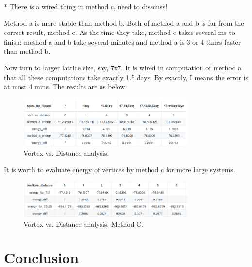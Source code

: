 \documentclass{article}
\begin{document}
* There is a wired thing in method c, need to disscuss!

Method a is more stable than method b. Both of method a and b is far from the correct result, method c. As the time they take, method c takes several ms to finish; method a and b take several minutes and method a is 3 or 4 times faster than method b.

Now turn to larger lattice size, say, 7x7. It is wired in computation of method a that all these computations take exactly 1.5 days. By exactly, I means the error is at most 4 mins. The results are as below.

\begin{figure}[!htb]
	\centering
	\includegraphics[width=0.8\textwidth]{./images/vort_dis.png}
	\caption{\label{tab:vort_dis} Vortex vs. Distance analysis.} 
\end{figure}

It is worth to evaluate energy of vertices by method c for more large systems.

\begin{figure}[!htb]
	\centering
	\includegraphics[width=0.8\textwidth]{./images/vort_dis_c.png}
	\caption{\label{tab:vort_dis} Vortex vs. Distance analysis: Method C.} 
\end{figure}




\section{Conclusion}
\label{sec:conclusion}
\end{document}

